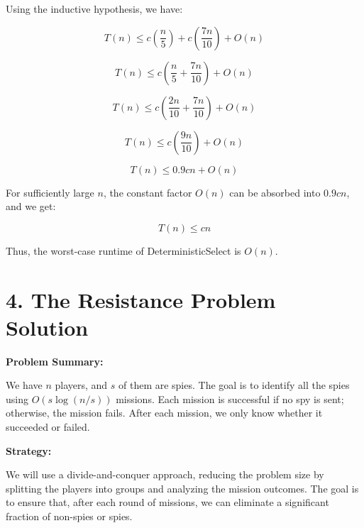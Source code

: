 \documentclass[11pt]{article}
\begin{document}
Using the inductive hypothesis, we have:

\[
T(n) \leq c \left( \frac{n}{5} \right) + c \left( \frac{7n}{10} \right) + O(n)
\]

\[
T(n) \leq c \left( \frac{n}{5} + \frac{7n}{10} \right) + O(n)
\]

\[
T(n) \leq c \left( \frac{2n}{10} + \frac{7n}{10} \right) + O(n)
\]

\[
T(n) \leq c \left( \frac{9n}{10} \right) + O(n)
\]

\[
T(n) \leq 0.9c n + O(n)
\]

For sufficiently large $n$, the constant factor $O(n)$ can be absorbed into $0.9c n$, and we get:

\[
T(n) \leq c n
\]

Thus, the worst-case runtime of DeterministicSelect is $O(n)$.


\newpage
\section*{4. The Resistance Problem Solution}


\textbf{Problem Summary:}

We have \(n\) players, and \(s\) of them are spies. The goal is to identify all the spies using \(O(s \log(n/s))\) missions. Each mission is successful if no spy is sent; otherwise, the mission fails. After each mission, we only know whether it succeeded or failed.

\textbf{Strategy:}

We will use a divide-and-conquer approach, reducing the problem size by splitting the players into groups and analyzing the mission outcomes. The goal is to ensure that, after each round of missions, we can eliminate a significant fraction of non-spies or spies.
\end{document}

